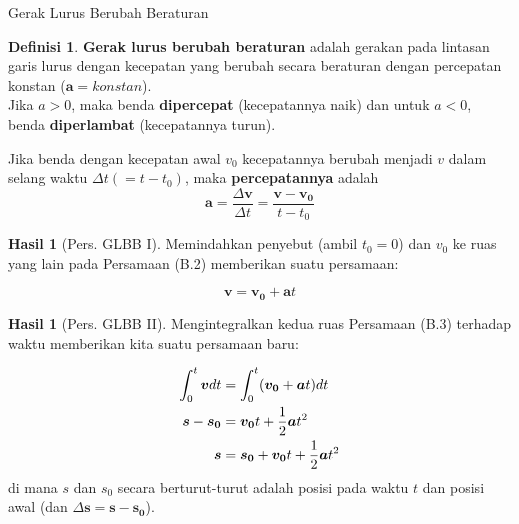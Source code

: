 \documentclass{beamer}
\theoremstyle{plain}
\theoremstyle{plain}
\theoremstyle{definition}
\newtheorem{defin}[teorema]{Definisi}
\newtheorem{corr}[teorema]{Hasil}
\numberwithin{equation}{section}
\begin{document}
	\begin{frame}{Gerak Lurus Berubah Beraturan}
		\begin{defin}
			\footnotesize
			\justifying \noindent \textbf{Gerak lurus berubah beraturan} adalah gerakan pada lintasan garis lurus dengan kecepatan yang berubah secara beraturan dengan percepatan konstan ($\boldsymbol{a} = konstan$). \\ \noindent Jika $a > 0$, maka benda \textbf{dipercepat} (kecepatannya naik) dan untuk $a < 0$, benda \textbf{diperlambat} (kecepatannya turun).
		\end{defin}
		
			{\footnotesize
			\justifying \noindent Jika benda dengan kecepatan awal $v_0$ kecepatannya berubah menjadi $v$ dalam selang waktu $\Delta t (= t - t_0)$, maka \textbf{percepatannya} adalah
			\begin{equation}
				\boldsymbol{a} = \frac{\Delta \boldsymbol{v}}{\Delta t} = \frac{\boldsymbol{v} - \boldsymbol{v_0}}{t - t_0}
			\end{equation}}
			
			\begin{corr}[Pers. GLBB I]
				\footnotesize Memindahkan penyebut (ambil $t_0 = 0$) dan $v_0$ ke ruas yang lain pada Persamaan (B.2) memberikan suatu persamaan:
				
				\begin{equation}
					\boldsymbol{v} = \boldsymbol{v_0} + \boldsymbol{a} t
				\end{equation}
			\end{corr}
			
	\end{frame}

	\begin{frame}
		\begin{corr}[Pers. GLBB II]
			\small
			Mengintegralkan kedua ruas Persamaan (B.3) terhadap waktu memberikan kita suatu persamaan baru:
			
			\vspace{-1em}
			
			\begin{align}
				\int_{0}^{t} \boldsymbol{v} dt &= \int_{0}^{t}(\boldsymbol{v_0} + \boldsymbol{a}t) dt \notag \\
				\boldsymbol{s} - \boldsymbol{s_0} &= \boldsymbol{v_0}t + \frac{1}{2}\boldsymbol{a}t^2 \notag \\
				\boldsymbol{s} &= \boldsymbol{s_0} + \boldsymbol{v_0}t + \frac{1}{2}\boldsymbol{a}t^2
			\end{align}
			di mana $s$ dan $s_0$ secara berturut-turut adalah posisi pada waktu $t$ dan posisi awal (dan $\Delta \boldsymbol{s} = \boldsymbol{s} - \boldsymbol{s_0}$).
		\end{corr}
	\end{frame}
	
\end{document}
